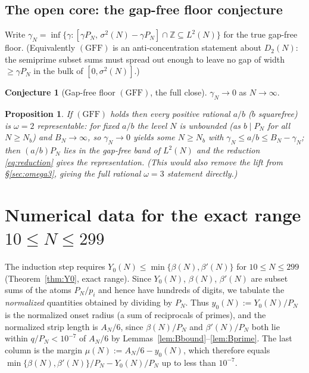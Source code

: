 \documentclass[11pt]{amsart}
\theoremstyle{plain}
\newtheorem{proposition}[theorem]{Proposition}
\theoremstyle{definition}
\newtheorem{conjecture}[theorem]{Conjecture}
\newcommand{\Z}{\mathbb{Z}}
\begin{document}
\subsection{The open core: the gap-free floor conjecture}
Write $\gamma_N=\inf\{\gamma:[\gamma P_N,\,\sigma^2(N)-\gamma P_N]\cap\Z\subseteq L^2(N)\}$
for the true gap-free floor.  (Equivalently $(\mathrm{GFF})$ is an
anti-concentration statement about $D_2(N)$: the semiprime subset sums must spread out
enough to leave no gap of width $\ge\gamma P_N$ in the bulk of $[0,\sigma^2(N)]$.)

\begin{conjecture}[Gap-free floor $(\mathrm{GFF})$, the full close]\label{conj:star}
$\gamma_N\to0$ as $N\to\infty$.
\end{conjecture}

\begin{proposition}
If $(\mathrm{GFF})$ holds then every positive rational $a/b$ ($b$ squarefree) is $\omega=2$
representable: for fixed $a/b$ the level $N$ is unbounded (as $b\mid P_N$ for all
$N\ge N_b$) and $B_N\to\infty$, so $\gamma_N\to0$ yields some $N\ge N_b$ with
$\gamma_N\le a/b\le B_N-\gamma_N$; then $(a/b)P_N$ lies in the gap-free band of
$L^2(N)$ and the reduction \eqref{eq:reduction} gives the representation.  (This
would also remove the lift from \S\ref{sec:omega3}, giving the full rational
$\omega=3$ statement directly.)
\end{proposition}


\appendix
\section{Numerical data for the exact range
\texorpdfstring{$10\le N\le 299$}{10<=N<=299}}\label{app:data}

The induction step requires $Y_0(N)\le\min\{\beta(N),\beta'(N)\}$ for $10\le N\le 299$
(Theorem~\ref{thm:Y0}, exact range).  Since $Y_0(N)$, $\beta(N)$, $\beta'(N)$ are subset
sums of the atoms $P_N/p_i$ and hence have hundreds of digits, we tabulate the
\emph{normalized} quantities obtained by dividing by $P_N$.  Thus
$y_0(N):=Y_0(N)/P_N$ is the normalized onset radius (a sum of reciprocals of
primes), and the normalized strip length is $A_N/6$, since
$\beta(N)/P_N$ and $\beta'(N)/P_N$ both lie within $q/P_N<10^{-7}$ of $A_N/6$ by
Lemmas~\ref{lem:Bbound}--\ref{lem:Bprime}.  The last column is the margin
$\mu(N):=A_N/6-y_0(N)$, which therefore equals $\min\{\beta(N),\beta'(N)\}/P_N-Y_0(N)/P_N$
up to less than $10^{-7}$.
\end{document}

